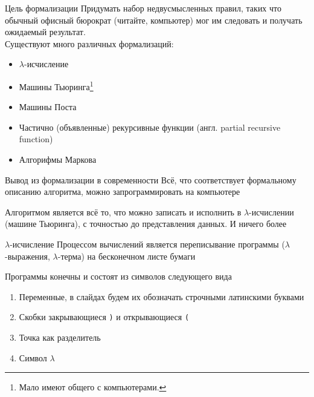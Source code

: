 \begin{frame}{Цель формализации}
Придумать набор недвусмысленных правил, таких что обычный офисный бюрократ (читайте, компьютер) мог им следовать и получать ожидаемый результат.\\

\vspace{1em}
Существуют много различных формализаций:
\begin{itemize}
\item $\lambda$-исчисление
\item Машины Тьюринга\footnote{Мало имеют общего с компьютерами. %
}
\item Машины Поста
\item Частично (объявленные) рекурсивные функции (англ. partial recursive function)
\item Алгорифмы Маркова
\end{itemize}
\end{frame}


\begin{frame}{Вывод из формализации в современности}
Всё, что соответствует формальному описанию алгоритма, можно запрограммировать на компьютере

\begin{definition}
Алгоритмом является всё то, что можно записать и исполнить в $\lambda$-исчислении (машине Тьюринга), с точностью до представления данных. И ничего более
\end{definition}

\end{frame}


\begin{frame}{$\lambda$-исчисление}
Процессом вычислений является переписывание программы ($\lambda$-выражения, $\lambda$-терма) на бесконечном листе бумаги

\vspace{1em}
Программы конечны и состоят из символов следующего вида
\begin{enumerate}
\item Переменные, в слайдах будем их обозначать строчными латинскими буквами
\item Скобки закрывающиеся \texttt{)} и открывающиеся \texttt{(}
\item Точка как разделитель
\item Символ $\lambda$
\end{enumerate}
\end{frame}



